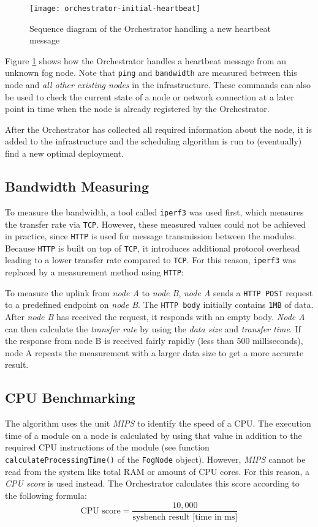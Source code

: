 \begin{figure}[htb]
    \centering
    \texttt{[image: orchestrator-initial-heartbeat]}
    \caption{Sequence diagram of the Orchestrator handling a new heartbeat message}
    \label{fig:orchestrator-initial-heartbeat}
\end{figure}

Figure \ref{fig:orchestrator-initial-heartbeat} shows how the Orchestrator handles a heartbeat message from an unknown fog node.
Note that \texttt{ping} and \texttt{bandwidth} are measured between this node and \textit{all other existing nodes} in the infrastructure.
These commands can also be used to check the current state of a node or network connection at a later point in time when the node is already registered by the Orchestrator.


After the Orchestrator has collected all required information about the node, it is added to the infrastructure and the scheduling algorithm is run to (eventually) find a new optimal deployment.


\subsection{Bandwidth Measuring\label{sec:measuring-bandwidth}}
To measure the bandwidth, a tool called \texttt{iperf3} was used first, which measures the transfer rate via \texttt{TCP}.
However, these measured values could not be achieved in practice, since \texttt{HTTP} is used for message transmission between the modules.
Because \texttt{HTTP} is built on top of \texttt{TCP}, it introduces additional protocol overhead leading to a lower transfer rate compared to \texttt{TCP}.
For this reason, \texttt{iperf3} was replaced by a measurement method using \texttt{HTTP}:

To measure the uplink from \textit{node A} to \textit{node B}, \textit{node A} sends a \texttt{HTTP POST} request to a predefined endpoint on \textit{node B}. The \texttt{HTTP body} initially contains \texttt{1MB} of data. After \textit{node B} has received the request, it responds with an empty body. \textit{Node A} can then calculate the \textit{transfer rate} by using the \textit{data size} and \textit{transfer time}.
If the response from node B is received fairly rapidly (less than 500 milliseconds), node A repeats the measurement with a larger data size to get a more accurate result.

\subsection{CPU Benchmarking\label{sec:benchmark-cpu}}
The algorithm uses the unit \textit{MIPS} to identify the speed of a CPU.
The execution time of a module on a node is calculated by using that value in addition to the required CPU instructions of the module (see function \texttt{calculateProcessingTime()} of the \texttt{FogNode} object).
However, \textit{MIPS} cannot be read from the system like total RAM or amount of CPU cores.
For this reason, a \textit{CPU score} is used instead. The Orchestrator calculates this score according to the following formula:
\[\textrm{CPU score} = \frac{10,000}{\textrm{sysbench result [time in ms]}}\]

